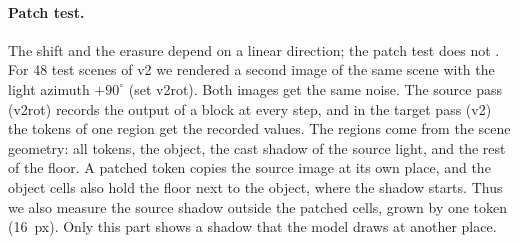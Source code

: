 \documentclass[10pt]{article}
\newcommand{\degr}{^\circ}
\begin{document}
\paragraph{Patch test.}
The shift and the erasure depend on a linear direction; the patch test does not \citep{meng2022locating,zhang2024patching,basu2024localizing}.
For 48 test scenes of v2 we rendered a second image of the same scene with the light azimuth $+90\degr$ (set v2rot).
Both images get the same noise.
The source pass (v2rot) records the output of a block at every step, and in the target pass (v2) the tokens of one region get the recorded values.
The regions come from the scene geometry: all tokens, the object, the cast shadow of the source light, and the rest of the floor.
A patched token copies the source image at its own place, and the object cells also hold the floor next to the object, where the shadow starts.
Thus we also measure the source shadow outside the patched cells, grown by one token (16~px). Only this part shows a shadow that the model draws at another place.
\end{document}
